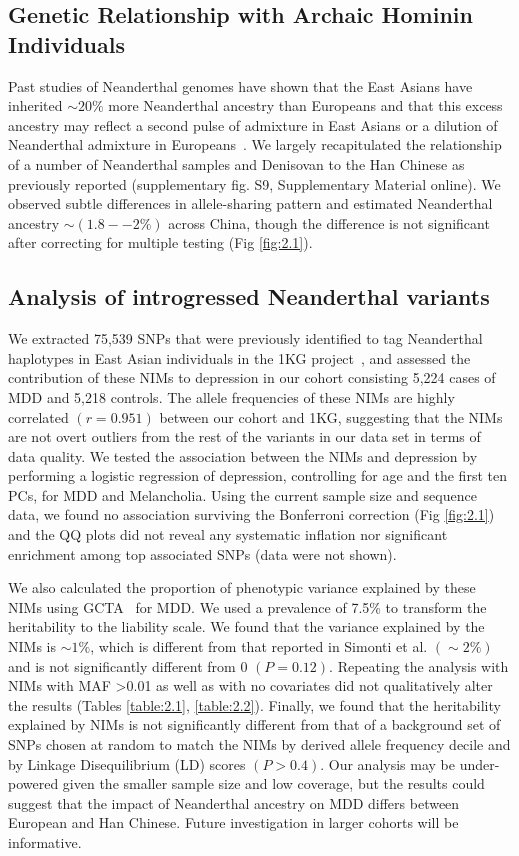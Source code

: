 \subsection{Genetic Relationship with Archaic Hominin Individuals}
Past studies of Neanderthal genomes have shown that the East Asians have inherited $\sim20\%$ more Neanderthal ancestry than Europeans and that this excess ancestry may reflect a second pulse of admixture in East Asians or a dilution of Neanderthal admixture in Europeans~\cite{prfer2014complete,sankararaman2014genomic,vernot2014resurrecting,kim2015selection}. We largely recapitulated the relationship of a number of Neanderthal samples and Denisovan to the Han Chinese as previously reported (supplementary fig. S9, Supplementary Material online). We observed subtle differences in allele-sharing pattern and estimated Neanderthal ancestry $\sim(1.8--2\%)$ across China, though the difference is not significant after correcting for multiple testing (Fig \ref{fig:2.1}).
\subsection{Analysis of introgressed Neanderthal variants}
We extracted 75,539 SNPs that were previously identified to tag Neanderthal haplotypes in East Asian individuals in the 1KG project~\cite{sankararaman2014genomic}, and assessed the contribution of these NIMs to depression in our cohort consisting 5,224 cases of MDD and 5,218 controls. The allele frequencies of these NIMs are highly correlated $(r=0.951)$ between our cohort and 1KG, suggesting that the NIMs are not overt outliers from the rest of the variants in our data set in terms of data quality. We tested the association between the NIMs and depression by performing a logistic regression of depression, controlling for age and the first ten PCs, for MDD and Melancholia. Using the current sample size and sequence data, we found no association surviving the Bonferroni correction (Fig \ref{fig:2.1}) and the QQ plots did not reveal any systematic inflation nor significant enrichment among top associated SNPs (data were not shown).

We also calculated the proportion of phenotypic variance explained by these NIMs using GCTA~\cite{yang2011gcta} for MDD. We used a prevalence of 7.5\% to transform the heritability to the liability scale. We found that the variance explained by the NIMs is $\sim1\%$, which is different from that reported in Simonti et al. $(\sim2\%)$ and is not significantly different from 0 $(P=0.12)$. Repeating the analysis with NIMs with MAF >0.01 as well as with no covariates did not qualitatively alter the results (Tables \ref{table:2.1}, \ref{table:2.2}). Finally, we found that the heritability explained by NIMs is not significantly different from that of a background set of SNPs chosen at random to match the NIMs by derived allele frequency decile and by Linkage Disequilibrium (LD) scores $(P>0.4)$. Our analysis may be under-powered given the smaller sample size and low coverage, but the results could suggest that the impact of Neanderthal ancestry on MDD differs between European and Han Chinese. Future investigation in larger cohorts will be informative.

